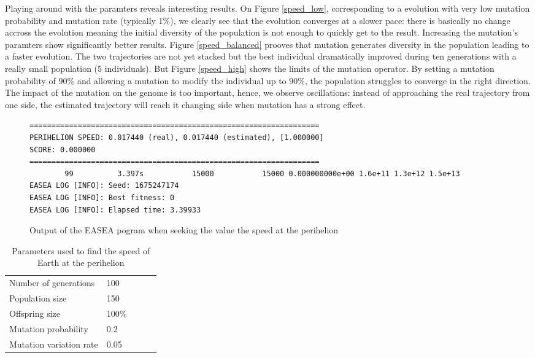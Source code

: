 Playing around with the paramters reveals interesting results. On Figure
\ref{speed_low}, corresponding to a evolution with very low mutation
probability and mutation rate (typically 1\%), we clearly see that the
evolution
converges at a slower pace: there is basically no change accross the evolution
meaning the initial diversity of the population is not enough to quickly get to
the result. Increasing the mutation's paramters show significantly better
results. Figure \ref{speed_balanced} prooves that mutation generates diversity
in the population leading to a faster evolution. The two trajectories are not
yet stacked but the best individual dramatically improved during ten
generations with a really small population (5 individuals). But Figure
\ref{speed_high} shows the limits of the mutation operator. By setting a
mutation probability of 90\% and allowing a mutation to modify the individual
up to 90\%, the population struggles to converge in the right direction. The
impact of the mutation on the genome is too important, hence, we observe
oscillations: instead of approaching the real trajectory from one side, the
estimated trajectory will reach it changing side when mutation has a strong
effect.\\

\begin{figure}
    \begin{lstlisting}
==================================================================
PERIHELION SPEED: 0.017440 (real), 0.017440 (estimated), [1.000000]
SCORE: 0.000000
==================================================================
        99          3.397s           15000           15000 0.000000000e+00 1.6e+11 1.3e+12 1.5e+13
EASEA LOG [INFO]: Seed: 1675247174
EASEA LOG [INFO]: Best fitness: 0
EASEA LOG [INFO]: Elapsed time: 3.39933
\end{lstlisting}
    \caption{Output of the EASEA pogram when seeking the value the speed at the perihelion}
    \label{speed_1}
\end{figure}

\begin{table}
    \begin{tabular}{lllll}
        Number of generations   & 100   \\
        Population size         & 150   \\
        Offspring size          & 100\% \\
        Mutation probability    & 0.2   \\
        Mutation variation rate & 0.05
    \end{tabular}
    \caption{Parameters used to find the speed of Earth at the perihelion}
    \label{speed_table}
\end{table}

